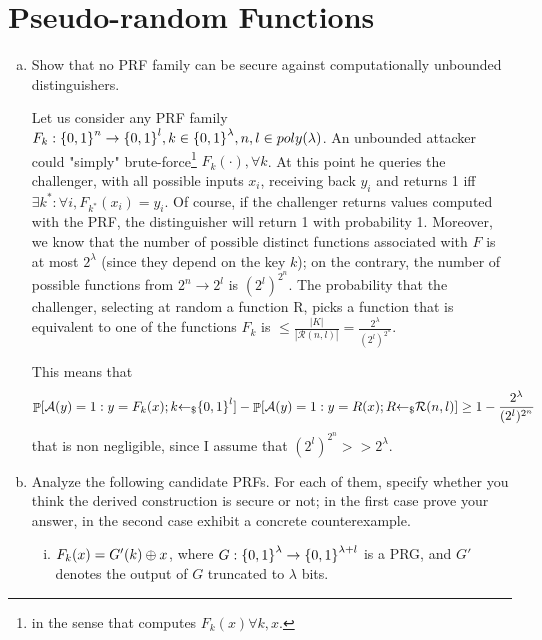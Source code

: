 \section{Pseudo-random Functions}
\begin{enumerate}[(a)]
	\item Show that no PRF family can be secure against computationally unbounded distinguishers.
	
	\begin{solution}
		Let us consider any PRF family $F_k: {\{0, 1\}}^n \to {\{0, 1\}}^l, k \in {\{0, 1\}}^\lambda, n, l \in poly(\lambda)$. An unbounded attacker could "simply" brute-force\footnote{in the sense that computes $F_k(x) \forall k,x$.} $F_k(\cdot), \forall k$. At this point he queries the challenger, with all possible inputs $x_i$, receiving back $y_i$ and returns 1 iff $\exists k^*: \forall i, F_{k^*}(x_i) = y_i$. Of course, if the challenger returns values computed with the PRF, the distinguisher will return 1 with probability 1. Moreover, we know that the number of possible distinct functions associated with $F$ is at most $2^\lambda$ (since they depend on the key $k$); on the contrary, the number of possible functions from $2^n \to 2^l$ is $(2^l)^{2^n}$. The probability that the challenger, selecting at random a function R, picks a function that is equivalent to one of the functions $F_k$ is $\le \frac{|K|}{|\mathcal{R}(n,l)|} = \frac{2^\lambda}{(2^l)^{2^n}}$.
		
		This means that
		\[\mathop{\mathbb P}[\mathcal{A}(y) = 1: y = F_k(x); k {\leftarrow_\$} {\{0, 1\}}^l] - \mathop{\mathbb P}[\mathcal{A}(y) = 1: y = R(x); R {\leftarrow_\$} \mathcal{R}(n, l)] \ge 1 - \frac{2^\lambda}{(2^l)^{2^n}}\]
		that is non negligible, since I assume that $(2^l)^{2^n} >> 2^\lambda$.
	\end{solution}
	
	\item Analyze the following candidate PRFs. For each of them, specify whether you think the derived construction is secure or not; in the first case prove your answer, in the second case exhibit a concrete counterexample.
	
	\begin{enumerate}[(i)]
		\item $F_k(x) = G'(k) \oplus x$, where $G: {\{0, 1\}}^\lambda \to {\{0, 1\}}^{\lambda + l}$ is a PRG, and $G'$ denotes the output of $G$ truncated to $\lambda$ bits.
		

\end{enumerate}
\end{enumerate}

